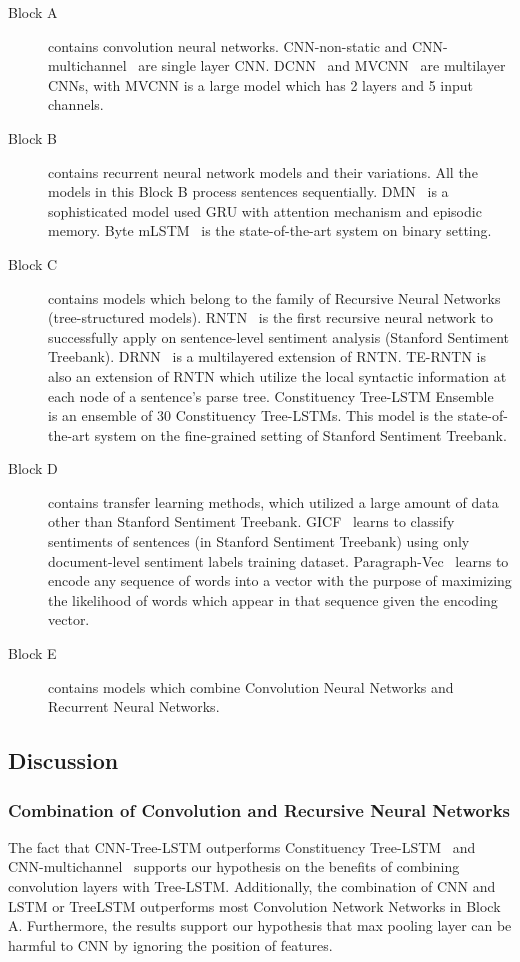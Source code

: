\begin{description}
	\item[Block A] contains convolution neural networks.
	CNN-non-static and CNN-multichannel~\cite{KimCNN} are single layer CNN.
	DCNN~\cite{DCNN} and MVCNN~\cite{2-layer-cnn} are multilayer CNNs, with MVCNN is a large model which has 2 layers and 5 input channels.
	\item[Block B] contains recurrent neural network models and their variations.
	All the models in this Block B process sentences sequentially.
	DMN~\cite{attention-gru} is a sophisticated model used GRU with attention mechanism and episodic memory.
	Byte mLSTM~\cite{mlstm} is the state-of-the-art system on binary setting.
	\item[Block C] contains models which belong to the family of Recursive Neural Networks (tree-structured models).
	RNTN~\cite{socher2013recursive} is the first recursive neural network to successfully apply on sentence-level sentiment analysis (Stanford Sentiment Treebank).
	DRNN~\cite{IrsoyDRNN} is a multilayered extension of RNTN.
	TE-RNTN is also an extension of RNTN which utilize the local syntactic information at each node of a sentence's parse tree.
	Constituency Tree-LSTM Ensemble~\cite{LooksHHN17} is an ensemble of 30 Constituency Tree-LSTMs.
	This model is the state-of-the-art system on the fine-grained setting of Stanford Sentiment Treebank.
	\item[Block D] contains transfer learning methods, which utilized a large amount of data other than Stanford Sentiment Treebank.
	GICF~\cite{group-instance} learns to classify sentiments of sentences (in Stanford Sentiment Treebank) using only document-level sentiment labels training dataset.
	Paragraph-Vec~\cite{ParagraphVec} learns to encode any sequence of words into a vector with the purpose of maximizing the likelihood of words which appear in that sequence given the encoding vector.
	\item[Block E] contains models which combine Convolution Neural Networks and Recurrent Neural Networks.
\end{description}
\subsection{Discussion}
\subsubsection{Combination of Convolution and Recursive Neural Networks}
The fact that CNN-Tree-LSTM outperforms Constituency Tree-LSTM~\cite{treeLSTM} and CNN-multichannel~\cite{KimCNN} supports our hypothesis on the benefits of combining convolution layers with Tree-LSTM.
Additionally, the combination of CNN and LSTM or TreeLSTM outperforms most Convolution Network Networks in Block A. Furthermore, the results support our hypothesis that max pooling layer can be harmful to CNN by ignoring the position of features.


